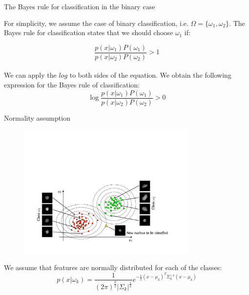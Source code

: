 \documentclass[xcolor=pdftex,dvipsnames,table]{beamer}
\begin{document}
\begin{frame}{The Bayes rule for classification in the binary case}

For simplicity, we assume the case of binary classification, i.e. $\Omega = \{\omega_1, \omega_2\}$. The Bayes rule for classification states that we should choose $\omega_1$ if: 

\begin{equation*}
\frac{p(x|\omega_1)P(\omega_1)}{p(x|\omega_2)P(\omega_2)} > 1 
\end{equation*}
\\
We can apply the $log$ to both sides of the equation. We obtain the following expression for the Bayes rule of classification:
\begin{equation}\label{equ:lda:condition}
\log{ \frac{p(x|\omega_1)P(\omega_1)}{p(x|\omega_2)P(\omega_2)} } > 0
\end{equation}

\end{frame}

\begin{frame}{Normality assumption}
\begin{figure}[htb]
\includegraphics[width=0.8\textwidth]{../graphics/LDA1.pdf}
\end{figure}
We assume that features are normally distributed for each of the classes:
\begin{equation}\label{equ:lda:normal}
p(x|\omega_k)=\frac{1}{(2\pi)^{\frac{p}{2}}|\Sigma_k|^{\frac{1}{2}}}e^{-\frac{1}{2}(x-\mu_k)^T\Sigma_k^{-1}(x-\mu_k)}
\end{equation}
\end{frame}
\end{document}
